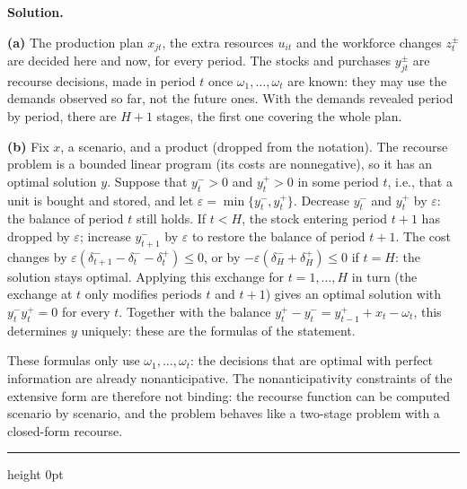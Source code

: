 \documentclass[11pt]{article}
\newenvironment{solution}
    {\par\nobreak\smallskip\noindent\textbf{Solution.}\par\nobreak\smallskip}
    {\par\medskip\hrule height 0pt\medskip}
\begin{document}
\begin{solution}
\textbf{(a)} The production plan $x_{jt}$, the extra resources $u_{it}$ and the
workforce changes $z_t^{\pm}$ are decided here and now, for every period. The
stocks and purchases $y_{jt}^{\pm}$ are recourse decisions, made in period $t$ once
$\omega_{1}, \ldots, \omega_{t}$ are known: they may use the demands observed so
far, not the future ones. With the demands revealed period by period, there are
$H + 1$ stages, the first one covering the whole plan.

\textbf{(b)} Fix $x$, a scenario, and a product (dropped from the notation). The
recourse problem is a bounded linear program (its costs are nonnegative), so it
has an optimal solution $y$. Suppose that $y_t^- > 0$ and $y_t^+ > 0$ in some
period $t$, i.e., that a unit is bought and stored, and let
$\varepsilon = \min\lbrace y_t^-, y_t^+ \rbrace$. Decrease $y_t^-$ and $y_t^+$ by
$\varepsilon$: the balance of period $t$ still holds. If $t < H$, the stock entering
period $t + 1$ has dropped by $\varepsilon$; increase $y_{t+1}^-$ by $\varepsilon$
to restore the balance of period $t+1$. The cost changes by
$\varepsilon(\delta_{t+1}^- - \delta_t^- - \delta_t^+) \leq 0$, or by
$-\varepsilon(\delta_H^- + \delta_H^+) \leq 0$ if $t = H$: the solution stays
optimal. Applying this exchange for $t = 1, \ldots, H$ in turn (the exchange at $t$
only modifies periods $t$ and $t + 1$) gives an optimal solution with
$y_t^- y_t^+ = 0$ for every $t$. Together with the balance
$y_t^+ - y_t^- = y_{t-1}^+ + x_t - \omega_t$, this determines $y$ uniquely: these
are the formulas of the statement.

These formulas only use $\omega_1, \ldots, \omega_t$: the decisions that are optimal
with perfect information are already nonanticipative. The nonanticipativity
constraints of the extensive form are therefore not binding: the recourse
function can be computed scenario by scenario, and the problem behaves like a
two-stage problem with a closed-form recourse.


\end{solution}
\end{document}
